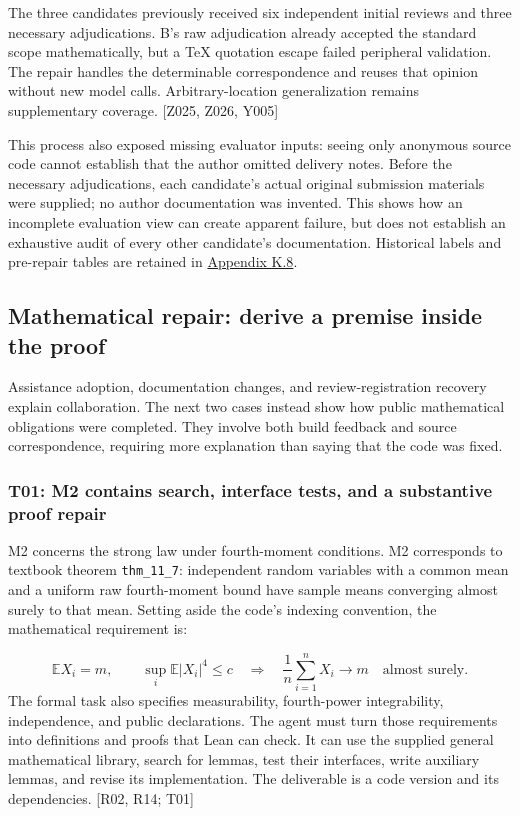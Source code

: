 The three candidates previously received six independent initial reviews and three necessary adjudications. B's raw adjudication already accepted the standard scope mathematically, but a TeX quotation escape failed peripheral validation. The repair handles the determinable correspondence and reuses that opinion without new model calls. Arbitrary-location generalization remains supplementary coverage. [Z025, Z026, Y005]

This process also exposed missing evaluator inputs: seeing only anonymous source code cannot establish that the author omitted delivery notes. Before the necessary adjudications, each candidate's actual original submission materials were supplied; no author documentation was invented. This shows how an incomplete evaluation view can create apparent failure, but does not establish an exhaustive audit of every other candidate's documentation. Historical labels and pre-repair tables are retained in \hyperlink{k8}{Appendix K.8}.

\subsection[Mathematical repair: derive a premise inside the proof]{\texorpdfstring{\protect\hypertarget{g14}{}Mathematical repair: derive a premise inside the proof}{Mathematical repair: derive a premise inside the proof}}
Assistance adoption, documentation changes, and review-registration recovery explain collaboration. The next two cases instead show how public mathematical obligations were completed. They involve both build feedback and source correspondence, requiring more explanation than saying that the code was fixed.

\subsubsection[T01: M2 contains search, interface tests, and a substantive proof repair]{\texorpdfstring{\protect\hypertarget{g14-1}{}T01: M2 contains search, interface tests, and a substantive proof repair}{T01: M2 contains search, interface tests, and a substantive proof repair}}
M2 concerns the strong law under fourth-moment conditions. M2 corresponds to textbook theorem \nolinkurl{thm_11_7}: independent random variables with a common mean and a uniform raw fourth-moment bound have sample means converging almost surely to that mean. Setting aside the code's indexing convention, the mathematical requirement is:

\[
\mathbb{E}X_i=m,\qquad \sup_i\mathbb{E}|X_i|^4\le c
\quad\Longrightarrow\quad
\frac1n\sum_{i=1}^{n}X_i\longrightarrow m\quad\text{almost surely}.
\]
The formal task also specifies measurability, fourth-power integrability, independence, and public declarations. The agent must turn those requirements into definitions and proofs that Lean can check. It can use the supplied general mathematical library, search for lemmas, test their interfaces, write auxiliary lemmas, and revise its implementation. The deliverable is a code version and its dependencies. [R02, R14; T01]

